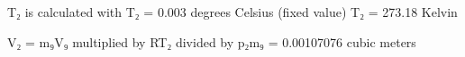 T₂ is calculated with T₂ = 0.003 degrees Celsius (fixed value)  
T₂ = 273.18 Kelvin  

V₂ = m₉V₉ multiplied by RT₂ divided by p₂m₉ = 0.00107076 cubic meters